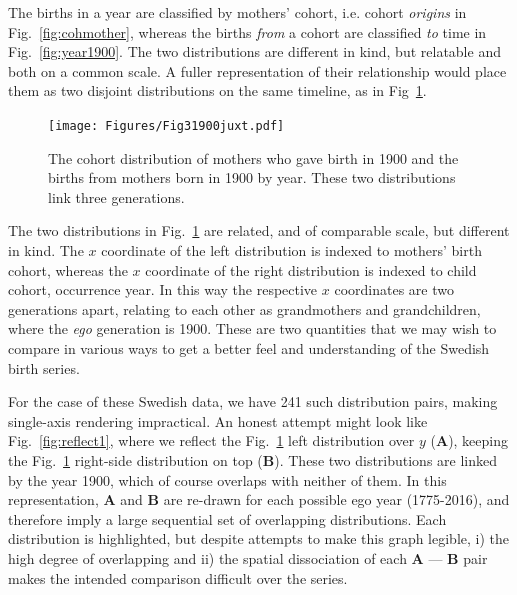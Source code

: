 \documentclass{article}
\begin{document}
The births in a year are classified by mothers' cohort, i.e. cohort \emph{origins} in Fig.~\ref{fig:cohmother}, whereas the births \emph{from} a cohort are classified \emph{to} time in Fig.~\ref{fig:year1900}. The two distributions are different in kind, but relatable and both on a common scale. A fuller representation of their relationship would place them as two disjoint distributions on the same timeline, as in Fig~\ref{fig:juxt}.

\begin{figure}[ht!]
 \centering
        \texttt{[image: Figures/Fig31900juxt.pdf]}
        \caption{The cohort distribution of mothers who gave birth in 1900 and the births from mothers born in 1900 by year. These two distributions link three generations.}
          \label{fig:juxt}
\end{figure}

The two distributions in Fig.~\ref{fig:juxt} are related, and of comparable scale, but different in kind. The $x$ coordinate of the left distribution is indexed to mothers' birth cohort, whereas the $x$ coordinate of the right distribution is indexed to child cohort, occurrence year. In this way the respective $x$ coordinates are two generations apart, relating to each other as grandmothers and grandchildren, where the \emph{ego} generation is 1900. These are two quantities that we may wish to compare in various ways to get a better feel and understanding of the Swedish birth series. 

For the case of these Swedish data, we have 241 such distribution pairs, making single-axis rendering impractical. An honest attempt might look like Fig.~\ref{fig:reflect1}, where we reflect the Fig.~\ref{fig:juxt} left distribution over $y$ (\textbf{A}), keeping the Fig.~\ref{fig:juxt} right-side distribution on top (\textbf{B}). These two distributions are linked by the year 1900, which of course overlaps with neither of them. In this representation, \textbf{A} and \textbf{B} are re-drawn for each possible ego year (1775-2016), and therefore imply a large sequential set of overlapping distributions. Each  distribution is highlighted, but despite attempts to make this graph legible, i) the high degree of overlapping and ii) the spatial dissociation of each \textbf{A} --- \textbf{B} pair makes the intended comparison difficult over the series.
\end{document}
